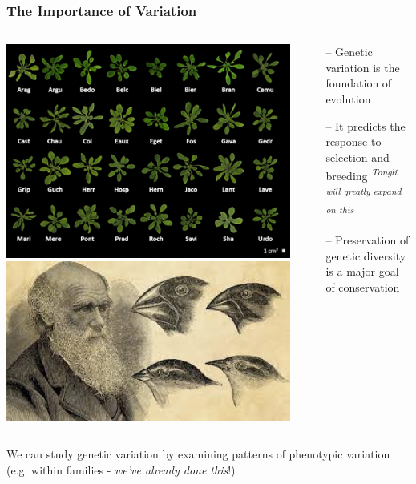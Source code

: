 \documentclass{beamer}
\begin{document}
\begin{frame}
\frametitle{The Importance of Variation}
\begin{columns}
	\begin{column}{0.5\textheight}
						\includegraphics[keepaspectratio, width  = \textwidth]{img/arabidopsisVariation}
						\includegraphics[keepaspectratio, width  = \textwidth]{img/DarwinFinch}
	\end{column}
	\begin{column}{0.5\textheight}
\begin{itemize}
	\item[--] Genetic variation is the foundation of evolution \pause
	\item[--] It predicts the response to selection and breeding \textsuperscript{\textit{Tongli will greatly expand on this}}\pause
	\item[--] Preservation of genetic diversity is a major goal of conservation
	\end{itemize}
	\end{column}
\end{columns}\pause 
\vspace{10pt}
\centering We can study genetic variation by examining patterns of phenotypic variation \\(e.g. within families - \textit{we've already done this}!) \\


\end{frame}
\end{document}
